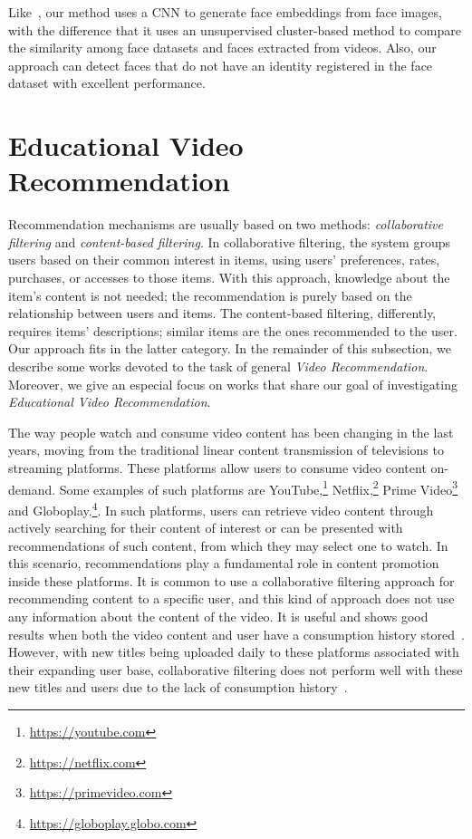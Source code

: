 Like~\cite{globofacestream, yang2017neural, rao2017attention, sohn2017unsupervised}, our method uses a CNN to generate face embeddings from face images, with the difference that it uses an unsupervised cluster-based method to compare the similarity among face datasets and faces extracted from videos. Also, our approach can detect faces that do not have an identity registered in the face dataset with excellent performance.

\section{Educational Video Recommendation}
\label{sec:recommendation}

Recommendation mechanisms are usually based on two methods: \textit{collaborative filtering} and \textit{content-based filtering}. 
In collaborative filtering, the system groups users based on their common interest in items, using users' preferences, rates, purchases, or accesses to those items. With this approach, 
knowledge about the item's content is not needed; the recommendation is purely based on the relationship between users and items.  The content-based filtering, differently, requires items' descriptions; similar items are the ones recommended to the user. Our approach fits in the latter category. In the remainder of this subsection, we describe some works devoted to the task of general \emph{Video Recommendation}. Moreover, we give an especial focus on works that share our goal of investigating \emph{Educational Video Recommendation}.

The way people watch and consume video content has been changing in the last years, moving from the traditional linear content transmission of televisions to streaming platforms. These platforms allow users to consume video content on-demand. Some examples of such platforms are YouTube,\footnote{\url{https://youtube.com}} Netflix,\footnote{\url{https://netflix.com}} Prime Video\footnote{\url{https://primevideo.com}} and Globoplay.\footnote{\url{https://globoplay.globo.com}}. In such platforms, users can retrieve video content through actively searching for their content of interest or can be presented with recommendations of such content, from which they may select one to watch. 
In this scenario, recommendations play a fundamental role in content promotion inside these platforms. It is common to use a collaborative filtering approach for recommending content to a specific user, and this kind of approach does not use any information about the content of the video. It is useful and shows good results when both the video content and user have a consumption history stored~\cite{ferreira2020investigating}. 
However, with new titles being uploaded daily to these platforms associated with their expanding user base, collaborative filtering does not perform well with these new titles and users due to the lack of consumption history~\cite{suvash14social}. 


